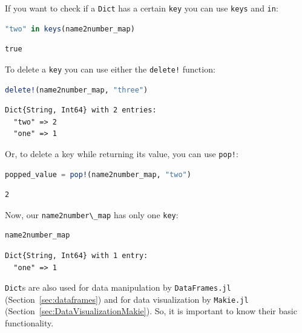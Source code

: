 \documentclass[
  notoc %
]{tufte-book}
\newcommand{\passthrough}[1]{#1}
\begin{document}
If you want to check if a \passthrough{\lstinline!Dict!} has a certain
\passthrough{\lstinline!key!} you can use \passthrough{\lstinline!keys!}
and \passthrough{\lstinline!in!}:

\begin{lstlisting}[language=Julia]
"two" in keys(name2number_map)
\end{lstlisting}

\begin{lstlisting}[language=Output]
true
\end{lstlisting}

To delete a \passthrough{\lstinline!key!} you can use either the
\passthrough{\lstinline"delete!"} function:

\begin{lstlisting}[language=Julia]
delete!(name2number_map, "three")
\end{lstlisting}

\begin{lstlisting}[language=Output]
Dict{String, Int64} with 2 entries:
  "two" => 2
  "one" => 1
\end{lstlisting}

Or, to delete a key while returning its value, you can use
\passthrough{\lstinline"pop!"}:

\begin{lstlisting}[language=Julia]
popped_value = pop!(name2number_map, "two")
\end{lstlisting}

\begin{lstlisting}[language=Output]
2
\end{lstlisting}

Now, our \passthrough{\lstinline!name2number\_map!} has only one
\passthrough{\lstinline!key!}:

\begin{lstlisting}[language=Julia]
name2number_map
\end{lstlisting}

\begin{lstlisting}[language=Output]
Dict{String, Int64} with 1 entry:
  "one" => 1
\end{lstlisting}

\passthrough{\lstinline!Dict!}s are also used for data manipulation by
\passthrough{\lstinline!DataFrames.jl!} (Section~\ref{sec:dataframes})
and for data visualization by \passthrough{\lstinline!Makie.jl!}
(Section~\ref{sec:DataVisualizationMakie}). So, it is important to know
their basic functionality.
\end{document}

